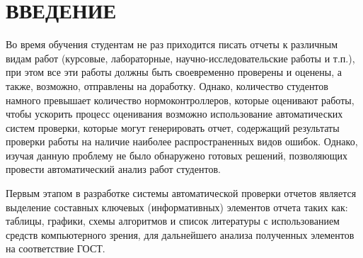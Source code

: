 \chapter*{ВВЕДЕНИЕ}

Во время обучения студентам не раз приходится писать отчеты к различным видам работ (курсовые, лабораторные, научно-исследовательские работы и т.п.), при этом все эти работы должны быть своевременно проверены и оценены, а также, возможно, отправлены на доработку. Однако, количество студентов намного превышает количество нормоконтроллеров, которые оценивают работы, чтобы ускорить процесс оценивания возможно использование автоматических систем проверки, которые могут генерировать отчет, содержащий результаты проверки работы на наличие наиболее распространенных видов ошибок. Однако, изучая данную проблему не было обнаружено готовых решений, позволяющих провести автоматический анализ работ студентов.

Первым этапом в разработке системы автоматической проверки отчетов является выделение составных ключевых (информативных) элементов отчета таких как: таблицы, графики, схемы алгоритмов и список литературы с использованием средств компьютерного зрения, для дальнейшего анализа полученных элементов на соответствие ГОСТ.
